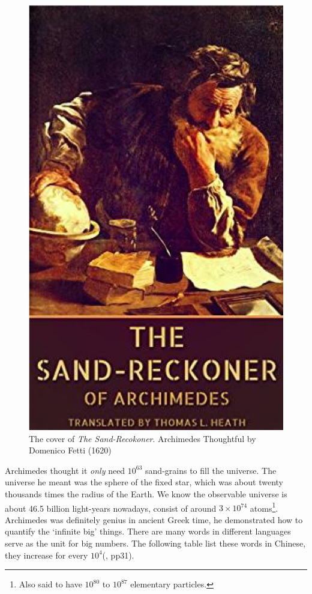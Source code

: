 \documentclass{article}
\begin{document}
\begin{figure}[htbp]
 \centering
 \includegraphics[scale=0.5]{img/Archimedes.png}
 \captionsetup{labelformat=empty}
 \caption{The cover of {\em The Sand-Recokoner}. Archimedes Thoughtful by Domenico Fetti (1620)}
 \label{fig:Archimedes}
\end{figure}

Archimedes thought it {\em only} need $10^{63}$ sand-grains to fill the universe. The universe he meant was the sphere of the fixed star, which was about twenty thousands times the radius of the Earth. We know the observable universe is about 46.5 billion light-years nowadays, consist of around $3 \times 10^{74}$ atoms\footnote{Also said to have $10^{80}$ to $10^{87}$ elementary particles.}. Archimedes was definitely genius in ancient Greek time, he demonstrated how to quantify the `infinite big' things. There are many words in different languages serve as the unit for big numbers. The following table list these words in Chinese, they increase for every $10^4$(\cite{Noguchi2007}, pp31).
\end{document}
